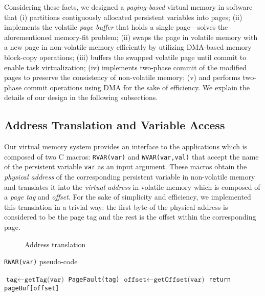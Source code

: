 Considering these facts, we designed a \emph{paging-based} virtual memory in software that (i) partitions contiguously allocated persistent variables into pages; (ii) implements the volatile \emph{page buffer} that holds a single page---solves the aforementioned memory-fit problem; (ii) swaps the page in volatile memory with a new page in non-volatile memory efficiently by utilizing DMA-based memory block-copy operations; (iii) buffers the swapped volatile page until commit to enable task virtualization; (iv) implements two-phase commit of the modified pages to preserve the consistency of non-volatile memory; (v) and performs two-phase commit operations using DMA for the sake of efficiency. We explain the details of our design in the following subsections.  

\subsection{Address Translation and Variable Access}

Our virtual memory system provides an interface to the applications which is composed of two C macros: \texttt{RVAR(var)} and \texttt{WVAR(var,val)} that accept the name of the persistent variable \texttt{var} as an input argument. These macros obtain the \emph{physical address} of the corresponding persistent variable in non-volatile memory and translates it into the \emph{virtual address} in volatile memory which is composed of a \emph{page tag} and \emph{offset}. For the sake of simplicity and efficiency, we implemented this translation in a trivial way: the first byte of the physical address is considered to be the page tag and the rest is the offset within the corresponding page. 

\begin{figure}
	\centering
	\caption{Address translation}
	\label{fig:address-translation}
\end{figure}

\begin{algorithm}[t]
	\caption{\texttt{RWAR(var)} pseudo-code}
	\label{algo:rwar}
	\scriptsize
	\begin{algorithmic}[1]
		\State $\texttt{tag}\leftarrow \texttt{getTag(var)}$ 
			
		\State	\texttt{PageFault(tag)} 
		\EndIf
				\State $\texttt{offset}\leftarrow \texttt{getOffset(var)}$ 		
		\State \texttt{return pageBuf[offset]}  
	\end{algorithmic}
\end{algorithm}



